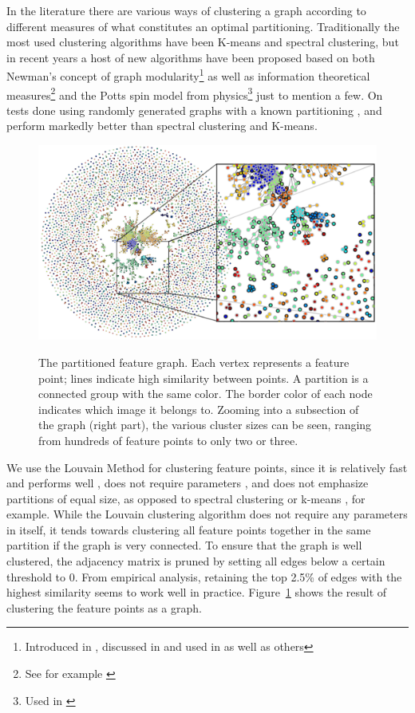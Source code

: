 In the literature there are various ways of clustering a graph according 
to different measures of what constitutes an optimal partitioning. 
Traditionally the most used clustering algorithms have been K-means and 
spectral clustering, but in recent years a host of new algorithms have 
been proposed based on both Newman's concept of graph 
modularity\footnote{Introduced in \cite{girvan2002}, discussed in 
\cite{brandes2007} and used in \cite{blondel2008} as well as others} as 
well as information theoretical measures\footnote{See for example 
\cite{rosvall2008}} and the Potts spin model from physics\footnote{Used 
in \cite{ronhovde2009}} just to mention a few. On tests done using 
randomly generated graphs with a known partitioning \cite{blondel2008}, 
\cite{rosvall2008} and \cite{ronhovde2009} perform markedly better than 
spectral clustering and K-means\cite{lancichinetti2009}.


\begin{figure}[t]
    \centering
	\includegraphics[width=\textwidth]{images/MMC_graph}
    \label{fig:graph}
	\caption{The partitioned feature graph. Each vertex represents a 
		feature point; lines indicate high similarity between points. A 
		partition is a connected group with the same color. The border 
		color of each node indicates which image it belongs to.  Zooming 
	into a subsection of the graph (right part), the various cluster 
sizes can be seen, ranging from hundreds of feature points to only two 
or three.}
	\label{fig:graph}
\end{figure}

We use the Louvain Method \cite{blondel2008} for clustering feature 
points, since it is relatively fast and performs well 
\cite{lancichinetti2009}, does not require parameters 
\cite{blondel2008}, and does not emphasize partitions of equal size, as 
opposed to spectral clustering or k-means \cite{von2007}, for example.
While the Louvain clustering algorithm does not require any parameters 
in itself, it tends towards clustering all feature points together in 
the same partition if the graph is very connected.  To ensure that the 
graph is well clustered, the adjacency matrix is pruned by setting all 
edges below a certain threshold to $0$.  From empirical analysis, 
retaining the top 2.5\% of edges with the highest similarity seems to 
work well in practice.  Figure~\ref{fig:graph} shows the result of 
clustering the feature points as a graph.

